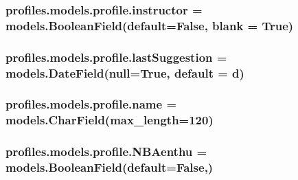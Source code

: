 \subsubsection[{\texorpdfstring{instructor}{instructor}}]{\setlength{\rightskip}{0pt plus 5cm}profiles.\+models.\+profile.\+instructor = models.\+Boolean\+Field(default=False, blank = True)\hspace{0.3cm}{\ttfamily [static]}}\hypertarget{classprofiles_1_1models_1_1profile_acfa71dd56ef725545087a5e16c4591ad}{}\label{classprofiles_1_1models_1_1profile_acfa71dd56ef725545087a5e16c4591ad}
\subsubsection[{\texorpdfstring{last\+Suggestion}{lastSuggestion}}]{\setlength{\rightskip}{0pt plus 5cm}profiles.\+models.\+profile.\+last\+Suggestion = models.\+Date\+Field(null=True, default = {\bf d})\hspace{0.3cm}{\ttfamily [static]}}\hypertarget{classprofiles_1_1models_1_1profile_adbe845698f928aed7032f3884ef85a72}{}\label{classprofiles_1_1models_1_1profile_adbe845698f928aed7032f3884ef85a72}
\subsubsection[{\texorpdfstring{name}{name}}]{\setlength{\rightskip}{0pt plus 5cm}profiles.\+models.\+profile.\+name = models.\+Char\+Field(max\+\_\+length=120)\hspace{0.3cm}{\ttfamily [static]}}\hypertarget{classprofiles_1_1models_1_1profile_aa33b7b8c3235c07c5e71c7a58c13c16c}{}\label{classprofiles_1_1models_1_1profile_aa33b7b8c3235c07c5e71c7a58c13c16c}
\subsubsection[{\texorpdfstring{N\+B\+Aenthu}{NBAenthu}}]{\setlength{\rightskip}{0pt plus 5cm}profiles.\+models.\+profile.\+N\+B\+Aenthu = models.\+Boolean\+Field(default=False,)\hspace{0.3cm}{\ttfamily [static]}}\hypertarget{classprofiles_1_1models_1_1profile_afc2a9d06cde3a75d3706077e9c1ba28d}{}\label{classprofiles_1_1models_1_1profile_afc2a9d06cde3a75d3706077e9c1ba28d}
